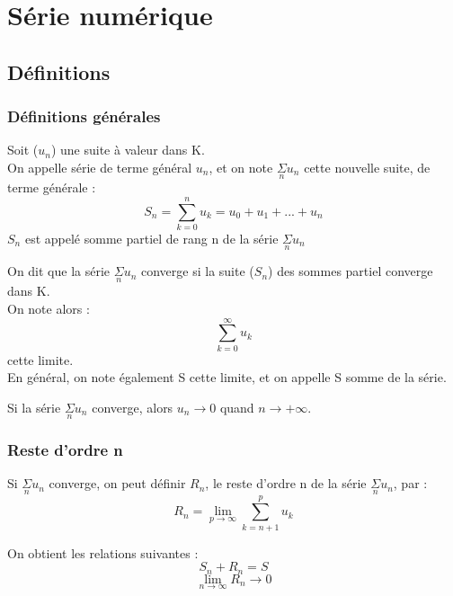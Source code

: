 \chapter{Série numérique}
\section{Définitions}
\subsection{Définitions générales}
\begin{de}
Soit ($u_n$) une suite à valeur dans K.\\
On appelle série de terme général $u_n$, et on note $\underset{n}\Sigma u_n$ cette nouvelle suite, de terme générale :
$$S_n = \sum_{k=0}^n u_k = u_0 +u_1 + ... +u_n$$
$S_n$ est appelé somme partiel de rang n de la série $\underset{n}\Sigma u_n$
\end{de}
\begin{de}
On dit que la série $\underset{n}\Sigma u_n$ converge si la suite ($S_n$) des sommes partiel converge dans K.\\
On note alors :
$$\sum_{k=0}^{\infty} u_k$$
cette limite.\\
En général, on note également S cette limite, et on appelle S somme de la série.
\end{de}
\begin{prop}
Si la série $\underset{n}\Sigma u_n$ converge, alors $u_n \rightarrow 0$ quand $ n \rightarrow +\infty$.
\end{prop}
\subsection{Reste d'ordre n}
\begin{de}
Si $\underset{n}\Sigma u_n$ converge, on peut définir $R_n$, le reste d'ordre n de la série $\underset{n}\Sigma u_n$, par :
$$R_n = \lim_{p \rightarrow \infty} \sum_{k=n+1}^p u_k$$
\end{de}
\begin{prop}
On obtient les relations suivantes : 
$$S_n + R_n = S$$
$$\lim_{n \rightarrow \infty} R_n \rightarrow 0$$
\end{prop}
